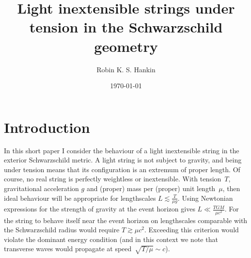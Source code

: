 \documentclass[prb,preprint]{revtex4-1}
\begin{document}

\title{Light inextensible strings under tension in the Schwarzschild geometry}

\author{Robin K. S. Hankin}


\date{\today}

\begin{abstract}

\end{abstract}


\maketitle %

\section{Introduction}

In this short paper I consider the behaviour of a light inextensible
string in the exterior Schwarzschild metric.  A light string is not
subject to gravity, and being under tension means that its
configuration is an extremum of proper length.  Of course, no real
string is perfectly weightless or inextensible.  With tension~$T$,
gravitational acceleration $g$ and (proper) mass per (proper) unit
length~$\mu$, then ideal behaviour will be appropriate for
lengthscales $L\lesssim\frac{T}{\mu g}$.  Using Newtonian expressions
for the strength of gravity at the event horizon gives
$L\ll\frac{TGM}{\mu c^2}$.  For the string to behave itself near the
event horizon on lengthscales comparable with the Schwarzschild radius
would require $T\gtrsim\mu c^2$.  Exceeding this criterion would
violate the dominant energy condition (and in this context we note
that transverse waves would propagate at speed~$\sqrt{T/\mu}\sim c$).
\end{document}
